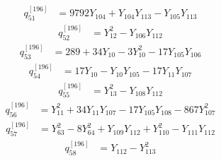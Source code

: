 \begin{equation}\label{q196:row:051}
\begin{aligned}
q_{51}^{[196]} &={} 9792Y_{104} + Y_{104}Y_{113} - Y_{105}Y_{113}
\end{aligned}
\end{equation}
\begin{equation}\label{q196:row:052}
\begin{aligned}
q_{52}^{[196]} &={} Y_{12}^{2} - Y_{106}Y_{112}
\end{aligned}
\end{equation}
\begin{equation}\label{q196:row:053}
\begin{aligned}
q_{53}^{[196]} &={} 289 + 34Y_{10} - 3Y_{10}^{2} - 17Y_{105}Y_{106}
\end{aligned}
\end{equation}
\begin{equation}\label{q196:row:054}
\begin{aligned}
q_{54}^{[196]} &={} 17Y_{10} - Y_{10}Y_{105} - 17Y_{11}Y_{107}
\end{aligned}
\end{equation}
\begin{equation}\label{q196:row:055}
\begin{aligned}
q_{55}^{[196]} &={} Y_{13}^{2} - Y_{108}Y_{112}
\end{aligned}
\end{equation}
\begin{equation}\label{q196:row:056}
\begin{aligned}
q_{56}^{[196]} &={} Y_{11}^{2} + 34Y_{11}Y_{107} - 17Y_{105}Y_{108} - 867Y_{107}^{2}
\end{aligned}
\end{equation}
\begin{equation}\label{q196:row:057}
\begin{aligned}
q_{57}^{[196]} &={} Y_{63}^{2} - 8Y_{64}^{2} + Y_{109}Y_{112} + Y_{110}^{2} - Y_{111}Y_{112}
\end{aligned}
\end{equation}
\begin{equation}\label{q196:row:058}
\begin{aligned}
q_{58}^{[196]} &={} Y_{112} - Y_{113}^{2}
\end{aligned}
\end{equation}
